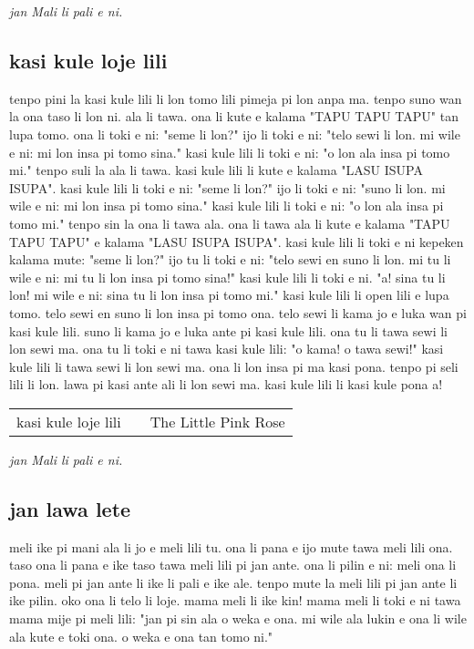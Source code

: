 \textit{jan Mali li pali e ni. \cite{www:astrodonunt:01}}

\subsection{kasi kule loje lili}

tenpo pini la kasi kule lili li lon tomo lili pimeja pi lon anpa ma.
tenpo suno wan la ona taso li lon ni.
ala li tawa.
ona li kute e kalama "TAPU TAPU TAPU" tan lupa tomo.
ona li toki e ni: "seme li lon?"
ijo li toki e ni: "telo sewi li lon.
mi wile e ni: mi lon insa pi tomo sina."
kasi kule lili li toki e ni: "o lon ala insa pi tomo mi."
tenpo suli la ala li tawa.
kasi kule lili li kute e kalama "LASU ISUPA ISUPA".
kasi kule lili li toki e ni: "seme li lon?"
ijo li toki e ni: "suno li lon.
mi wile e ni: mi lon insa pi tomo sina."
kasi kule lili li toki e ni: "o lon ala insa pi tomo mi."
tenpo sin la ona li tawa ala.
ona li tawa ala li kute e kalama "TAPU TAPU TAPU" e kalama "LASU ISUPA ISUPA".
kasi kule lili li toki e ni kepeken kalama mute: "seme li lon?"
ijo tu li toki e ni: "telo sewi en suno li lon.
mi tu li wile e ni: mi tu li lon insa pi tomo sina!"
kasi kule lili li toki e ni.
"a!
sina tu li lon!
mi wile e ni: sina tu li lon insa pi tomo mi."
kasi kule lili li open lili e lupa tomo.
telo sewi en suno li lon insa pi tomo ona.
telo sewi li kama jo e luka wan pi kasi kule lili.
suno li kama jo e luka ante pi kasi kule lili.
ona tu li tawa sewi li lon sewi ma.
ona tu li toki e ni tawa kasi kule lili: "o kama!
o tawa sewi!"
kasi kule lili li tawa sewi li lon sewi ma.
ona li lon insa pi ma kasi pona.
tenpo pi seli lili li lon.
lawa pi kasi ante ali li lon sewi ma.
kasi kule lili li kasi kule pona a!

\begin{supertabular}{p{5,5cm}|ll}
    kasi kule loje lili &  & The Little Pink Rose \\
\end{supertabular}

\textit{jan Mali li pali e ni. \cite{www:astrodonunt:01}}
%
\newpage
\subsection{jan lawa lete}

meli ike pi mani ala li jo e meli lili tu.
ona li pana e ijo mute tawa meli lili ona.
taso ona li pana e ike taso tawa meli lili pi jan ante.
ona li pilin e ni: meli ona li pona.
meli pi jan ante li ike li pali e ike ale.
tenpo mute la meli lili pi jan ante li ike pilin.
oko ona li telo li loje.
mama meli li ike kin!
mama meli li toki e ni tawa mama mije pi meli lili:
"jan pi sin ala o weka e ona.
mi wile ala lukin e ona li wile ala kute e toki ona.
o weka e ona tan tomo ni."

